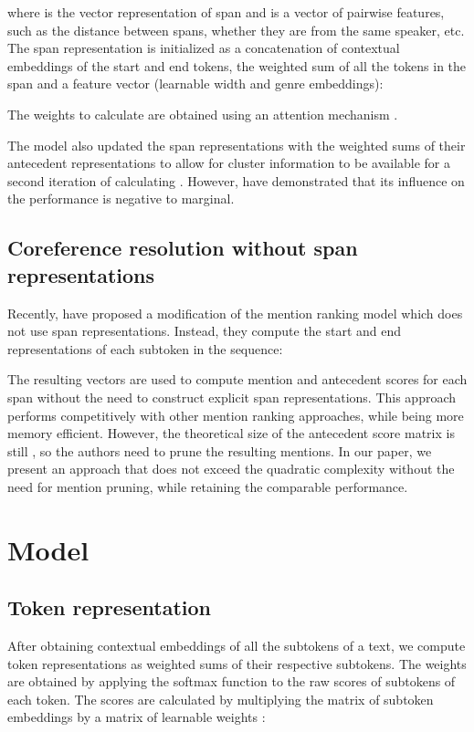 \documentclass[11pt]{article}
\begin{document}
where  is the vector representation of span  and  is a vector of pairwise features, such as the distance between spans, whether they are from the same speaker, etc. The span representation  is initialized as a concatenation of contextual embeddings of the start and end tokens, the weighted sum of all the tokens in the span and a feature vector (learnable width and genre embeddings):

The weights to calculate  are obtained using an attention mechanism \citep{bahdanau2014neural}.

The model also updated the span representations with the weighted sums of their antecedent representations to allow for cluster information to be available for a second iteration of calculating . However, \citet{xu-choi-2020-revealing} have demonstrated that its influence on the performance is negative to marginal.

\subsection{Coreference resolution without span representations}
Recently, \citet{kirstain-etal-2021-no-span} have proposed a modification of the mention ranking model which does not use span representations. Instead, they compute the start and end representations of each subtoken in the sequence:

The resulting vectors are used to compute mention and antecedent scores for each span without the need to construct explicit span representations. This approach performs competitively with other mention ranking approaches, while being more memory efficient. However, the theoretical size of the antecedent score matrix is still , so the authors need to prune the resulting mentions. In our paper, we present an approach that does not exceed the quadratic complexity without the need for mention pruning, while retaining the comparable performance.

\section{Model}
\subsection{Token representation}
After obtaining contextual embeddings of all the subtokens of a text, we compute token representations  as weighted sums of their respective subtokens. The weights are obtained by applying the softmax function to the raw scores of subtokens of each token. The scores are calculated by multiplying the matrix of subtoken embeddings  by a matrix of learnable weights :
\end{document}
